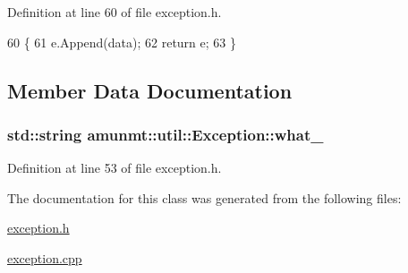 Definition at line 60 of file exception.\+h.


\begin{DoxyCode}
60                                                                                                            
                             \{
61   e.Append(data);
62   \textcolor{keywordflow}{return} e;
63 \}
\end{DoxyCode}


\subsection{Member Data Documentation}
\subsubsection[{\texorpdfstring{what\+\_\+}{what_}}]{\setlength{\rightskip}{0pt plus 5cm}std\+::string amunmt\+::util\+::\+Exception\+::what\+\_\+\hspace{0.3cm}{\ttfamily [private]}}\hypertarget{classamunmt_1_1util_1_1Exception_a33c467c532b9023837208ab9138f23d8}{}\label{classamunmt_1_1util_1_1Exception_a33c467c532b9023837208ab9138f23d8}


Definition at line 53 of file exception.\+h.



The documentation for this class was generated from the following files\+:\begin{DoxyCompactItemize}
\item 
\hyperlink{exception_8h}{exception.\+h}\item 
\hyperlink{exception_8cpp}{exception.\+cpp}\end{DoxyCompactItemize}
